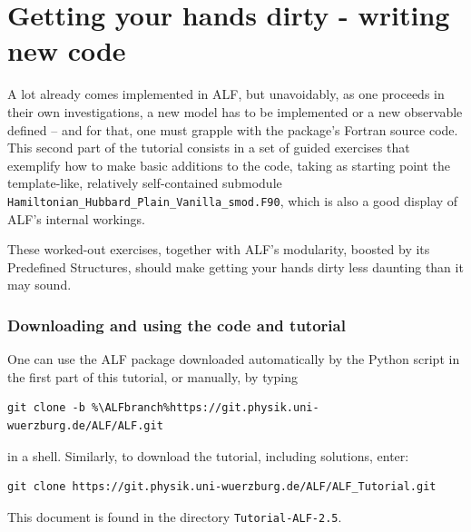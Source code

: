 \documentclass[10pt,modern]{scrartcl}
\numberwithin{exerciseitem}{exercise} %
\newcommand{\ALFver}{2.5}          %
\newcommand{\ALFbranch}{ALF-2.5}   %
\newcommand{\tutALFver}{2.5}       %
\begin{document}











\newpage

\part{Getting your hands dirty - writing new code}

A lot already comes implemented in ALF, but unavoidably, as one proceeds in their own investigations, a new model has to be implemented or a new observable defined -- and for that, one must grapple with the package's Fortran source code. 
This second part of the tutorial consists in a set of guided exercises that exemplify how to make basic additions to the code, taking as starting point the template-like, relatively self-contained submodule \texttt{Hamiltonian\_Hubbard\_Plain\_Vanilla\_smod.F90}, which is also a good display of ALF's internal workings.

These worked-out exercises, together with ALF's modularity, boosted by its Predefined Structures, should make getting your hands dirty less daunting than it may sound.


\section*{Downloading and using the code and tutorial}
One can use the ALF package downloaded automatically by the Python script in the first part of this tutorial, or manually, by typing
\begin{lstlisting}[style=bash,escapechar=\%]
git clone -b %\ALFbranch%https://git.physik.uni-wuerzburg.de/ALF/ALF.git
\end{lstlisting}
in a shell. Similarly, to download the tutorial, including solutions, enter:
\begin{lstlisting}[style=bash]
git clone https://git.physik.uni-wuerzburg.de/ALF/ALF_Tutorial.git
\end{lstlisting}
This document is found in the directory \texttt{Tutorial-ALF-\tutALFver{}}.
\end{document}
